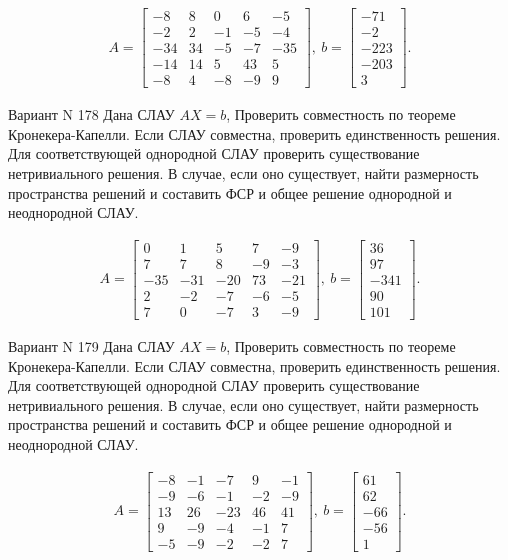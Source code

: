 \documentclass[11pt]{report}
\begin{document}
\begin{align*}
 A = \left[\begin{matrix}-8 & 8 & 0 & 6 & -5\\-2 & 2 & -1 & -5 & -4\\-34 & 34 & -5 & -7 & -35\\-14 & 14 & 5 & 43 & 5\\-8 & 4 & -8 & -9 & 9\end{matrix}\right],
\ b = \left[\begin{matrix}-71\\-2\\-223\\-203\\3\end{matrix}\right]. 
 \end{align*}

Вариант N 178
Дана СЛАУ $AX = b$,
Проверить совместность по теореме Кронекера-Капелли. Если СЛАУ совместна, проверить единственность решения.
Для соответствующей однородной СЛАУ проверить существование нетривиального решения. В случае, если оно существует,
найти размерность пространства решений и составить ФСР и общее решение однородной  и неоднородной СЛАУ.


\begin{align*}
 A = \left[\begin{matrix}0 & 1 & 5 & 7 & -9\\7 & 7 & 8 & -9 & -3\\-35 & -31 & -20 & 73 & -21\\2 & -2 & -7 & -6 & -5\\7 & 0 & -7 & 3 & -9\end{matrix}\right],
\ b = \left[\begin{matrix}36\\97\\-341\\90\\101\end{matrix}\right]. 
 \end{align*}

Вариант N 179
Дана СЛАУ $AX = b$,
Проверить совместность по теореме Кронекера-Капелли. Если СЛАУ совместна, проверить единственность решения.
Для соответствующей однородной СЛАУ проверить существование нетривиального решения. В случае, если оно существует,
найти размерность пространства решений и составить ФСР и общее решение однородной  и неоднородной СЛАУ.


\begin{align*}
 A = \left[\begin{matrix}-8 & -1 & -7 & 9 & -1\\-9 & -6 & -1 & -2 & -9\\13 & 26 & -23 & 46 & 41\\9 & -9 & -4 & -1 & 7\\-5 & -9 & -2 & -2 & 7\end{matrix}\right],
\ b = \left[\begin{matrix}61\\62\\-66\\-56\\1\end{matrix}\right]. 
 \end{align*}
\end{document}
